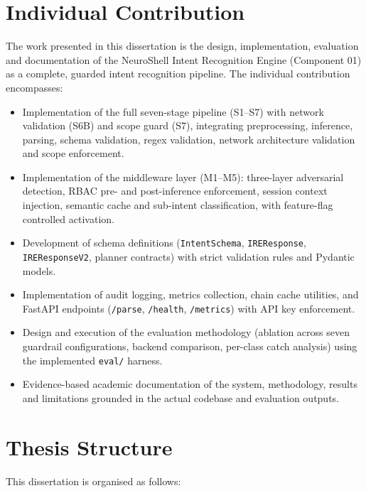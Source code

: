 \section{Individual Contribution}\label{sec:intro-contribution}

The work presented in this dissertation is the design, implementation, evaluation and documentation of the NeuroShell Intent Recognition Engine (Component 01) as a complete, guarded intent recognition pipeline. The individual contribution encompasses:
\begin{itemize}
  \item Implementation of the full seven-stage pipeline (S1--S7) with network validation (S6B) and scope guard (S7), integrating preprocessing, inference, parsing, schema validation, regex validation, network architecture validation and scope enforcement.
  \item Implementation of the middleware layer (M1--M5): three-layer adversarial detection, RBAC pre- and post-inference enforcement, session context injection, semantic cache and sub-intent classification, with feature-flag controlled activation.
  \item Development of schema definitions (\texttt{IntentSchema}, \texttt{IREResponse}, \texttt{IREResponseV2}, planner contracts) with strict validation rules and Pydantic models.
  \item Implementation of audit logging, metrics collection, chain cache utilities, and FastAPI endpoints (\texttt{/parse}, \texttt{/health}, \texttt{/metrics}) with API key enforcement.
  \item Design and execution of the evaluation methodology (ablation across seven guardrail configurations, backend comparison, per-class catch analysis) using the implemented \texttt{eval/} harness.
  \item Evidence-based academic documentation of the system, methodology, results and limitations grounded in the actual codebase and evaluation outputs.
\end{itemize}

\section{Thesis Structure}\label{sec:intro-structure}

This dissertation is organised as follows:

